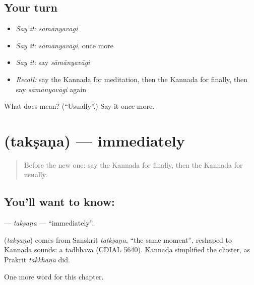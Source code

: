 \subsection*{Your turn}
\begin{itemize}
\raggedright
  \item \emph{Say it:} \emph{sāmānyavāgi}
  \item \emph{Say it:} \emph{sāmānyavāgi}, once more
  \item \emph{Say it:} say \emph{sāmānyavāgi}
  \item \emph{Recall:} say the Kannada for meditation, then the Kannada for finally, then say \emph{sāmānyavāgi} again
\end{itemize}

\begin{tcolorbox}[breakable,colback=teal!4,colframe=teal!35!black,title={Before you move on}]
What does  mean? (\textquotedblleft{}Usually\textquotedblright{}.) Say it once more.
\end{tcolorbox}
\section[\texorpdfstring{\kn{ತಕ್ಷಣ} (takṣaṇa)}{ತಕ್ಷಣ (takṣaṇa)}]{ (takṣaṇa) — immediately}

\label{lesson:KA-C210-taksana}



\begin{quote}
Before the new one: say the Kannada for finally, then the Kannada for usually.
\end{quote}

\subsection*{You'll want to know: }
\textbf{} — \emph{takṣaṇa} — \textquotedblleft{}immediately\textquotedblright{}.

\begin{cousinweb}
\textbf{} (\emph{takṣaṇa}) comes from Sanskrit \emph{tatkṣaṇa}, \textquotedblleft{}the same moment\textquotedblright{}, reshaped to Kannada sounds: a tadbhava (CDIAL 5640). Kannada simplified the cluster, as Prakrit \emph{takkhaṇa} did.
\end{cousinweb}

\begin{grammarlens}[title={What you've built}]
One more word for this chapter.
\end{grammarlens}

